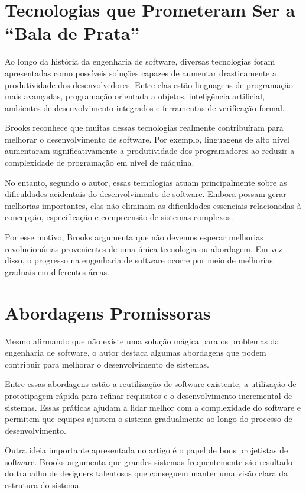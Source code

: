 \documentclass[conference]{IEEEtran}
\begin{document}
\section{Tecnologias que Prometeram Ser a ``Bala de Prata''}

Ao longo da história da engenharia de software, diversas tecnologias foram apresentadas como possíveis soluções capazes de aumentar drasticamente a produtividade dos desenvolvedores. Entre elas estão linguagens de programação mais avançadas, programação orientada a objetos, inteligência artificial, ambientes de desenvolvimento integrados e ferramentas de verificação formal.

Brooks reconhece que muitas dessas tecnologias realmente contribuíram para melhorar o desenvolvimento de software. Por exemplo, linguagens de alto nível aumentaram significativamente a produtividade dos programadores ao reduzir a complexidade de programação em nível de máquina.

No entanto, segundo o autor, essas tecnologias atuam principalmente sobre as dificuldades acidentais do desenvolvimento de software. Embora possam gerar melhorias importantes, elas não eliminam as dificuldades essenciais relacionadas à concepção, especificação e compreensão de sistemas complexos.

Por esse motivo, Brooks argumenta que não devemos esperar melhorias revolucionárias provenientes de uma única tecnologia ou abordagem. Em vez disso, o progresso na engenharia de software ocorre por meio de melhorias graduais em diferentes áreas.

\section{Abordagens Promissoras}

Mesmo afirmando que não existe uma solução mágica para os problemas da engenharia de software, o autor destaca algumas abordagens que podem contribuir para melhorar o desenvolvimento de sistemas.

Entre essas abordagens estão a reutilização de software existente, a utilização de prototipagem rápida para refinar requisitos e o desenvolvimento incremental de sistemas. Essas práticas ajudam a lidar melhor com a complexidade do software e permitem que equipes ajustem o sistema gradualmente ao longo do processo de desenvolvimento.

Outra ideia importante apresentada no artigo é o papel de bons projetistas de software. Brooks argumenta que grandes sistemas frequentemente são resultado do trabalho de designers talentosos que conseguem manter uma visão clara da estrutura do sistema.
\end{document}
